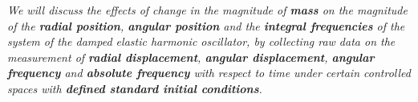 \textit{We will discuss the effects of change in the magnitude of \textbf{mass} on the magnitude of the \textbf{radial position}, \textbf{angular position} and the \textbf{integral frequencies} of the system of the damped elastic harmonic oscillator, by collecting raw data on the measurement of \textbf{radial displacement}, \textbf{angular displacement}, \textbf{angular frequency} and \textbf{absolute frequency} with respect to time under certain controlled spaces with \textbf{defined standard initial conditions}.}
